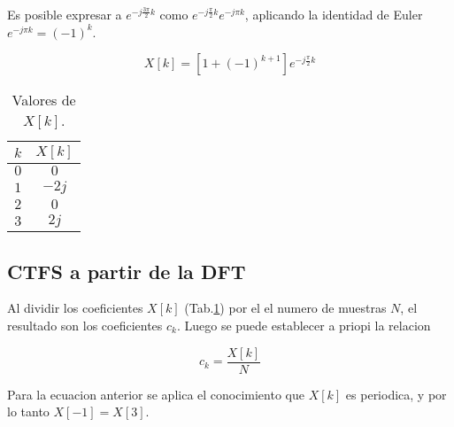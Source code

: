 \documentclass[letterpaper]{article}
\begin{document}
    Es posible expresar a $e^{-j\frac{ 3 \pi}{2}k}$ como $e^{-j \frac{\pi }{2}k}e^{-j\pi k}$, aplicando la identidad de Euler 
    $e^{-j \pi k}= (-1)^k$. 

    \begin{equation}
        X[k]= [ 1 + (-1)^{k+1} ] e^{ -j \frac{\pi }{2} k }
    \end{equation}

    \begin{table}[H]
        \centering
        \begin{tabular}{|c|c|}
            \hline $k$ & $X[k]$ \\
            \hline $0$ & $0$ \\
            \hline $1$ & $-2j$ \\
            \hline $2$ & $0$ \\
            \hline $3$ & $2j$ \\
            \hline
        \end{tabular}
        \caption{Valores de $X[k]$.}
        \label{tab.xk}
    \end{table}

    \subsection{CTFS a partir de la DFT}

    Al dividir los coeficientes $X[k]$ (Tab.\ref{tab.xk}) por el el numero de muestras $N$, el resultado son los coeficientes 
    $c_k$. Luego se puede establecer a priopi la relacion 
    
    \begin{equation}
        c_k = \frac{X[k]}{N}
    \end{equation}

    Para la ecuacion anterior se aplica el conocimiento que $X[k]$ es periodica, y por lo tanto $X[-1]=X[3]$.
\end{document}
